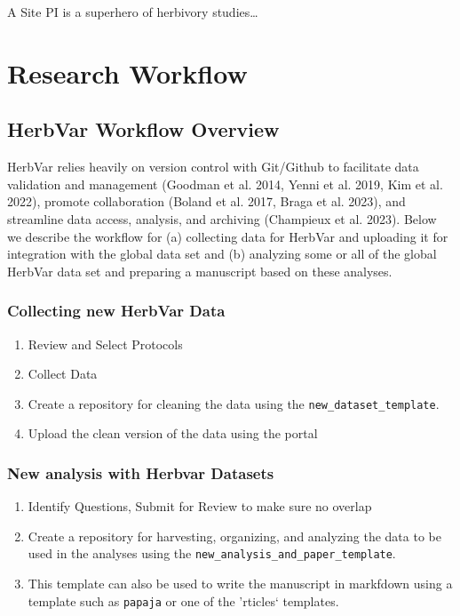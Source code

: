 \documentclass[
  letterpaper,
  DIV=11,
  numbers=noendperiod]{scrreprt}
\providecommand{\tightlist}{%
  \setlength{\itemsep}{0pt}\setlength{\parskip}{0pt}}\usepackage{longtable,booktabs,array}
\begin{document}
A Site PI is a superhero of herbivory studies\ldots{}

\part{Research Workflow}

\chapter{HerbVar Workflow Overview}\label{sec-workflow}

HerbVar relies heavily on version control with Git/Github to facilitate
data validation and management (Goodman et al. 2014, Yenni et al. 2019,
Kim et al. 2022), promote collaboration (Boland et al. 2017, Braga et
al. 2023), and streamline data access, analysis, and archiving
(Champieux et al. 2023). Below we describe the workflow for (a)
collecting data for HerbVar and uploading it for integration with the
global data set and (b) analyzing some or all of the global HerbVar data
set and preparing a manuscript based on these analyses.

\section{Collecting new HerbVar Data}\label{collecting-new-herbvar-data}

\begin{enumerate}
\def\labelenumi{\arabic{enumi}.}
\tightlist
\item
  Review and Select Protocols
\item
  Collect Data
\item
  Create a repository for cleaning the data using the
  \texttt{new\_dataset\_template}.
\item
  Upload the clean version of the data using the portal
\end{enumerate}

\section{New analysis with Herbvar
Datasets}\label{new-analysis-with-herbvar-datasets}

\begin{enumerate}
\def\labelenumi{\arabic{enumi}.}
\tightlist
\item
  Identify Questions, Submit for Review to make sure no overlap
\item
  Create a repository for harvesting, organizing, and analyzing the data
  to be used in the analyses using the
  \texttt{new\_analysis\_and\_paper\_template}.
\item
  This template can also be used to write the manuscript in markfdown
  using a template such as \texttt{papaja} or one of the 'rticles`
  templates.
\end{enumerate}
\end{document}
